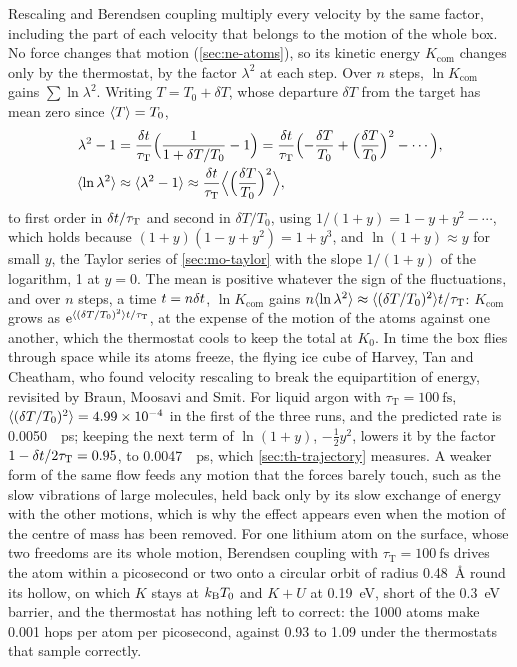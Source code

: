 Rescaling and Berendsen coupling multiply every velocity by the same
factor, including the part of each velocity that belongs to the motion of
the whole box. No force changes that motion (\cref{sec:ne-atoms}), so its
kinetic energy $K_{\mathrm{com}}$ changes only by the thermostat, by the
factor $\lambda^2$ at each step. Over $n$ steps, $\ln K_{\mathrm{com}}$
gains $\sum\ln\lambda^2$. Writing $T = T_0 + \delta T$, whose departure
$\delta T$ from the target has mean zero since $\langle T \rangle = T_0$,
\begin{align*}
   \lambda^2 - 1 &= \frac{\delta t}{\tau_{\mathrm T}}\Bigl(\frac{1}{1 + \delta
   T/T_0} - 1\Bigr) = \frac{\delta t}{\tau_{\mathrm T}}\Bigl(-\frac{\delta T}{T_0}
   + \Bigl(\frac{\delta T}{T_0}\Bigr)^2 - \dotsb\Bigr) ,\\
   \langle \ln\lambda^2 \rangle &\approx \langle \lambda^2 - 1 \rangle
   \approx \frac{\delta t}{\tau_{\mathrm T}}\Bigl\langle\Bigl(\frac{\delta
   T}{T_0}\Bigr)^2\Bigr\rangle ,
\end{align*}
to first order in $\delta t/\tau_{\mathrm T}$ and second in $\delta T/T_0$,
using $1/(1 + y) = 1 - y + y^2 - \dotsb$, which holds because $(1 + y)(1 -
y + y^2) = 1 + y^3$, and $\ln(1 + y) \approx y$ for small $y$, the Taylor
series of \cref{sec:mo-taylor} with the slope $1/(1 + y)$ of the
logarithm, 1 at $y = 0$. The mean is positive whatever the sign of the
fluctuations, and over $n$ steps, a time $t = n\delta t$, $\ln K_{\mathrm{com}}$
gains $n\langle \ln\lambda^2 \rangle \approx \langle (\delta T/T_0)^2 \rangle t/\tau_{\mathrm
T}$: $K_{\mathrm{com}}$ grows as $\mathrm{e}^{\langle (\delta
T/T_0)^2 \rangle t/\tau_{\mathrm T}}$, at
the expense of the motion of the atoms against one another, which the
thermostat cools to keep the total at $K_0$. In time the box flies
through space while its atoms freeze, the flying ice cube of Harvey, Tan
and Cheatham, who found velocity rescaling to break the equipartition of
energy\cite{Harvey1998}, revisited by Braun, Moosavi and
Smit\cite{Braun2018}.
For liquid argon with $\tau_{\mathrm T} = \SI{100}{\femto\second}$,
$\langle (\delta T/T_0)^2 \rangle = \num{4.99e-4}$ in the first of the three runs, and the
predicted rate is \SI{0.0050}{\per\pico\second}; keeping the next term of
$\ln(1 + y)$, $-\frac12y^2$, lowers it by the factor $1 - \delta t/2\tau_{\mathrm
T} = 0.95$, to \SI{0.0047}{\per\pico\second}, which
\cref{sec:th-trajectory} measures. A weaker form of the same flow feeds
any motion that the forces barely touch, such as the slow vibrations of
large molecules, held back only by its slow exchange of energy with the
other motions, which is why the effect appears even when the motion of
the centre of mass has been removed\cite{Harvey1998,Braun2018}. For one lithium atom on the surface, whose two freedoms are
its whole motion, Berendsen coupling with $\tau_{\mathrm T} =
\SI{100}{\femto\second}$ drives the atom within a picosecond or two onto
a circular orbit of radius \SI{0.48}{\angstrom} round its hollow, on which
$K$ stays at $k_{\mathrm{B}} T_0$ and $K + U$ at \SI{0.19}{\electronvolt}, short of
the \SI{0.3}{\electronvolt} barrier, and the thermostat has nothing left to
correct: the 1000 atoms make 0.001 hops per atom per picosecond, against
0.93 to 1.09 under the thermostats that sample correctly.

